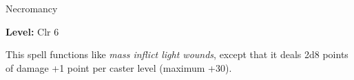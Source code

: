 \label{spell:Mass Inflict Moderate Wounds}

Necromancy

\textbf{Level:} Clr 6

This spell functions like \textit{mass inflict light wounds}, except that it deals 
2d8 points of damage +1 point per caster level (maximum +30).

